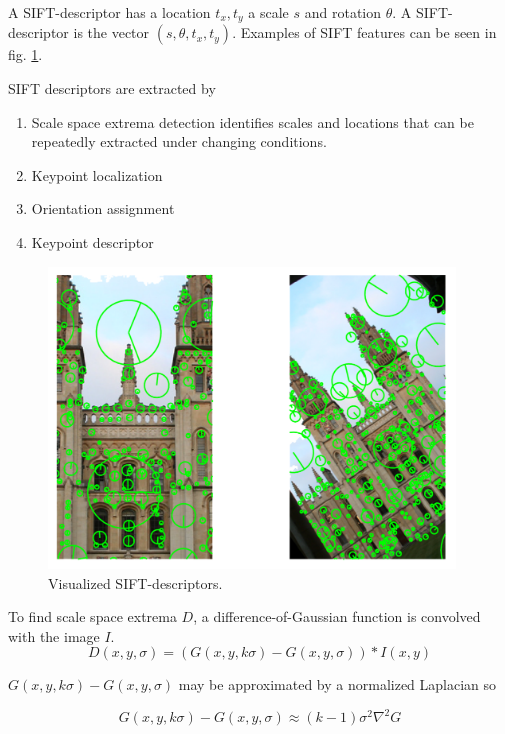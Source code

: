 \documentclass[english,12pt,a4paper,pdftex,elec,utf8, table]{aaltothesis}
\begin{document}
A SIFT-descriptor has a location $t_x, t_y$ a scale $s$ and rotation $\theta$. A SIFT-descriptor is the vector $(s, \theta, t_x, t_y)$. Examples of SIFT features can be seen in fig. \ref{siftfeatures}.

SIFT descriptors are extracted by

\begin{enumerate}
\item Scale space extrema detection identifies scales and locations that can be repeatedly extracted under changing conditions.
\item Keypoint localization
\item Orientation assignment
\item Keypoint descriptor
\end{enumerate}
\cite{Lowe2004}

\begin{figure}[htb]
\begin{center}
\includegraphics[height=8cm]{figures/siftDescriptor}
\end{center}
\caption{Visualized SIFT-descriptors.}
\label{siftfeatures}
\end{figure}

To find scale space extrema $D$, a difference-of-Gaussian function is convolved with the image $I$.
\begin{equation}\label{keypoints}
  D(x,y,\sigma) = (G(x,y,k\sigma) - G(x, y, \sigma))*I(x,y)
\end{equation}\cite{Lowe2004}

$G(x,y,k\sigma) - G(x, y, \sigma)$ may be approximated by a normalized Laplacian so

\begin{equation}\label{approximatedog}
G(x,y,k\sigma) - G(x, y, \sigma) \approx (k - 1)\sigma^{2}\nabla^{2}G
\end{equation}\cite{Lowe2004}
\end{document}
